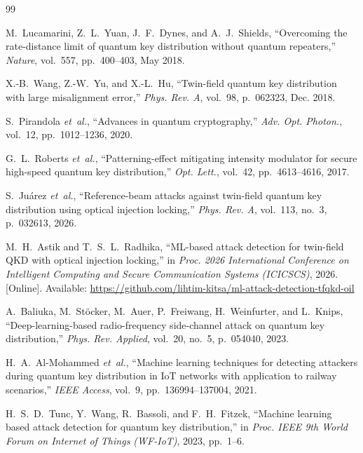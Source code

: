 \documentclass[journal,twocolumn]{IEEEtran}
\begin{document}
\begin{thebibliography}{99}

M.~Lucamarini, Z.~L.~Yuan, J.~F.~Dynes, and A.~J.~Shields,
``Overcoming the rate-distance limit of quantum key distribution without
quantum repeaters,''
\emph{Nature}, vol.~557, pp.~400--403, May 2018.

X.-B.~Wang, Z.-W.~Yu, and X.-L.~Hu,
``Twin-field quantum key distribution with large misalignment error,''
\emph{Phys. Rev. A}, vol.~98, p.~062323, Dec. 2018.

S.~Pirandola \emph{et~al.},
``Advances in quantum cryptography,''
\emph{Adv. Opt. Photon.}, vol.~12, pp.~1012--1236, 2020.

G.~L.~Roberts \emph{et~al.},
``Patterning-effect mitigating intensity modulator for secure high-speed
quantum key distribution,''
\emph{Opt. Lett.}, vol.~42, pp.~4613--4616, 2017.

S.~Juárez \emph{et~al.},
``Reference-beam attacks against twin-field quantum key distribution using
optical injection locking,''
\emph{Phys. Rev. A}, vol.~113, no.~3, p.~032613, 2026.

M.~H.~Astik and T.~S.~L.~Radhika,
``ML-based attack detection for twin-field QKD with optical injection locking,''
in \emph{Proc. 2026 International Conference on Intelligent Computing and Secure
Communication Systems (ICICSCS)}, 2026. [Online]. Available:
\url{https://github.com/lihtim-kitsa/ml-attack-detection-tfqkd-oil}

A.~Baliuka, M.~Stöcker, M.~Auer, P.~Freiwang, H.~Weinfurter, and L.~Knips,
``Deep-learning-based radio-frequency side-channel attack on quantum key distribution,''
\emph{Phys. Rev. Applied}, vol.~20, no.~5, p.~054040, 2023.

H.~A.~Al-Mohammed \emph{et~al.},
``Machine learning techniques for detecting attackers during quantum key distribution
in IoT networks with application to railway scenarios,''
\emph{IEEE Access}, vol.~9, pp.~136994--137004, 2021.

H.~S.~D.~Tunc, Y.~Wang, R.~Bassoli, and F.~H.~Fitzek,
``Machine learning based attack detection for quantum key distribution,''
in \emph{Proc. IEEE 9th World Forum on Internet of Things (WF-IoT)}, 2023, pp.~1--6.


\end{thebibliography}
\end{document}
